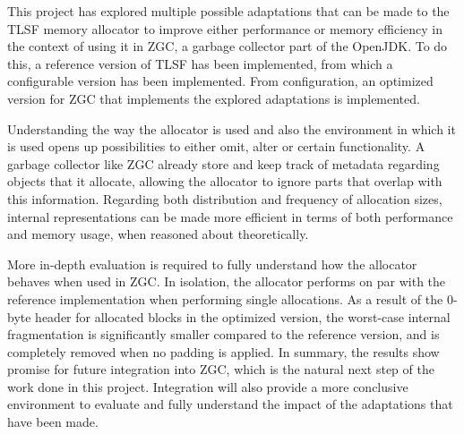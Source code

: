 
This project has explored multiple possible adaptations that can be made to the TLSF memory allocator to improve either performance or memory efficiency in the context of using it in ZGC, a garbage collector part of the OpenJDK. To do this, a reference version of TLSF has been implemented, from which a configurable version has been implemented. From configuration, an optimized version for ZGC that implements the explored adaptations is implemented.

Understanding the way the allocator is used and also the environment in which it is used opens up possibilities to either omit, alter or certain functionality. A garbage collector like ZGC already store and keep track of metadata regarding objects that it allocate, allowing the allocator to ignore parts that overlap with this information. Regarding both distribution and frequency of allocation sizes, internal representations can be made more efficient in terms of both performance and memory usage, when reasoned about theoretically.

More in-depth evaluation is required to fully understand how the allocator behaves when used in ZGC. In isolation, the allocator performs on par with the reference implementation when performing single allocations. As a result of the 0-byte header for allocated blocks in the optimized version, the worst-case internal fragmentation is significantly smaller compared to the reference version, and is completely removed when no padding is applied. In summary, the results show promise for future integration into ZGC, which is the natural next step of the work done in this project. Integration will also provide a more conclusive environment to evaluate and fully understand the impact of the adaptations that have been made.

